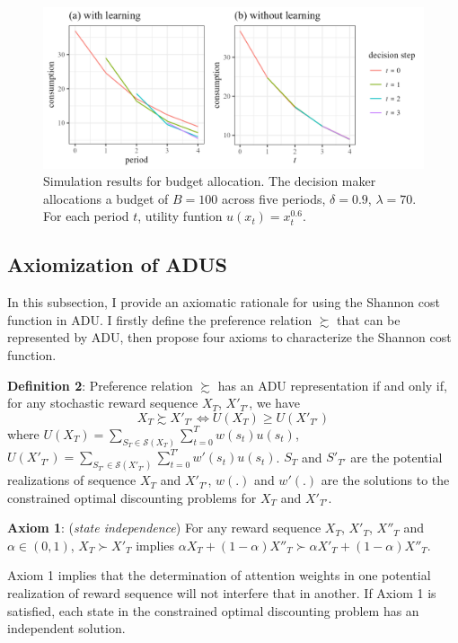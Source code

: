 \documentclass[
  12pt,
]{article}
\begin{document}
\begin{figure}
  \centering
  \includegraphics{images/plot-budget-dynamic.png}
  \caption{Simulation results for budget allocation. The decision maker allocations a budget of $B=100$ across five periods, $\delta=0.9$, $\lambda=70$. For each period $t$, utility funtion $u(x_t)=x_t^{0.6}$.}
  \label{fig:plot-budget-dynamic}
\end{figure}

\hypertarget{axiomization-of-adus}{%
\subsection{\texorpdfstring{Axiomization of ADUS
\label{axiom}}{Axiomization of ADUS }}\label{axiomization-of-adus}}

In this subsection, I provide an axiomatic rationale for using the
Shannon cost function in ADU. I firstly define the preference relation
\(\succsim\) that can be represented by ADU, then propose four axioms to
characterize the Shannon cost function.

\textbf{Definition 2}: Preference relation \(\succsim\) has an ADU
representation if and only if, for any stochastic reward sequence
\(X_T\), \(X'_{T'}\), we have \[
X_T \succsim X'_{T'} \Longleftrightarrow U(X_T)\geq U(X'_{T'})
\]where
\(U(X_T)=\sum_{S_T\in\mathcal{S}(X_T)}\sum_{t=0}^T w(s_t)u(s_t)\),
\(U(X'_{T'})=\sum_{S_{T'}\in\mathcal{S}(X'_{T'})}\sum_{t=0}^{T'}w'(s_t)u(s_t)\).
\(S_T\) and \(S'_{T'}\) are the potential realizations of sequence
\(X_T\) and \(X'_{T'}\), \(w(.)\) and \(w'(.)\) are the solutions to the
constrained optimal discounting problems for \(X_T\) and \(X'_{T'}\).

\textbf{Axiom 1}: (\emph{state independence}) For any reward sequence
\(X_T\), \(X'_T\), \(X''_T\) and \(\alpha\in(0,1)\), \(X_T\succ X'_T\)
implies
\(\alpha X_T+ (1-\alpha)X''_T \succ \alpha X'_T + (1-\alpha) X''_T\).

Axiom 1 implies that the determination of attention weights in one
potential realization of reward sequence will not interfere that in
another. If Axiom 1 is satisfied, each state in the constrained optimal
discounting problem has an independent solution.
\end{document}
